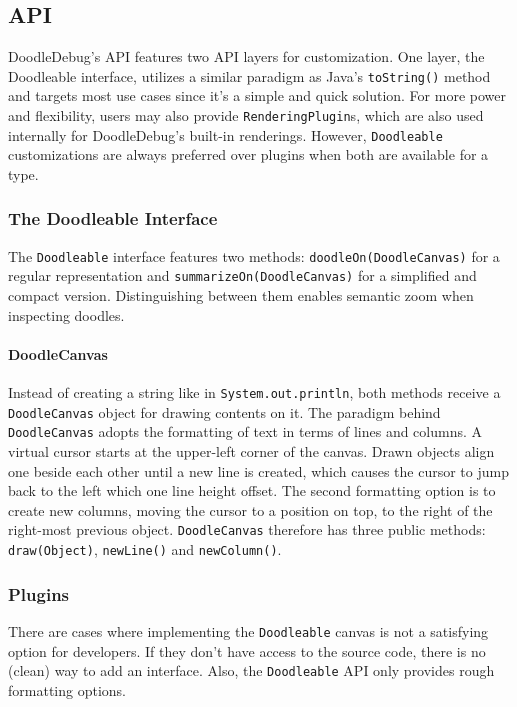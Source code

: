 \documentclass[english]{scrartcl}
\newcommand{\nb}[2]{\nbc{#1}{#2}{orange}}
\newcommand\todo[1]{\nb{TO DO}{#1}}
\newcommand{\DD}{Dood\-le\-De\-bug\xspace}
\newcommand{\println}{\texttt{Sys\-tem.\-out.\-println}\xspace}
\begin{document}
\subsection{API}
\DD's API features two API layers for customization.
One layer, the Doodleable interface, utilizes a similar paradigm as Java's \texttt{toString()} method and targets most use cases since it's a simple and quick solution.
For more power and flexibility, users may also provide \texttt{RenderingPlugin}s, which are also used internally for \DD's built-in renderings.
However, \texttt{Doodleable} customizations are always preferred over plugins when both are available for a type.

\subsubsection{The Doodleable Interface}

The \texttt{Doodleable} interface features two methods: \texttt{doodleOn(DoodleCanvas)} for a regular representation and \texttt{summarizeOn(DoodleCanvas)} for a simplified and compact version.
Distinguishing between them enables semantic zoom \cite{semantic-zoom} when inspecting doodles.

\paragraph{DoodleCanvas}
Instead of creating a string like in \println, both methods receive a \texttt{DoodleCanvas} object for drawing contents on it.
The paradigm behind \texttt{DoodleCanvas} adopts the formatting of text in terms of lines and columns.
A virtual cursor starts at the upper-left corner of the canvas.
Drawn objects align one beside each other until a new line is created, which causes the cursor to jump back to the left which one line height offset.
The second formatting option is to create new columns, moving the cursor to a position on top, to the right of the right-most previous object.
\texttt{DoodleCanvas} therefore has three public methods: \texttt{draw(Object)}, \texttt{newLine()} and \texttt{newColumn()}.

\todo{Image here}

\subsubsection{Plugins}
There are cases where implementing the \texttt{Doodleable} canvas is not a satisfying option for developers.
If they don't have access to the source code, there is no (clean) way to add an interface.
Also, the \texttt{Doodleable} API only provides rough formatting options.
\end{document}
